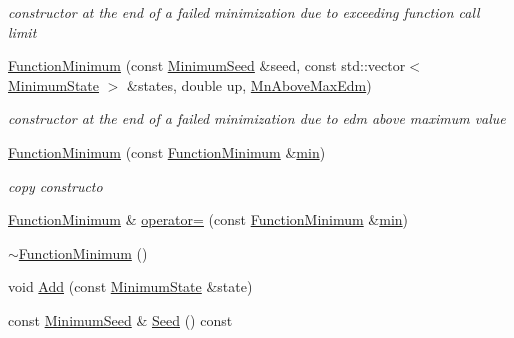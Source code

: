 \begin{DoxyCompactItemize}
\begin{DoxyCompactList}\small\item\em constructor at the end of a failed minimization due to exceeding function call limit \end{DoxyCompactList}\item 
\mbox{\hyperlink{classROOT_1_1Minuit2_1_1FunctionMinimum_a70961c8a405bd4298247c9b353804154}{Function\+Minimum}} (const \mbox{\hyperlink{classROOT_1_1Minuit2_1_1MinimumSeed}{Minimum\+Seed}} \&seed, const std\+::vector$<$ \mbox{\hyperlink{classROOT_1_1Minuit2_1_1MinimumState}{Minimum\+State}} $>$ \&states, double up, \mbox{\hyperlink{classROOT_1_1Minuit2_1_1FunctionMinimum_1_1MnAboveMaxEdm}{Mn\+Above\+Max\+Edm}})
\begin{DoxyCompactList}\small\item\em constructor at the end of a failed minimization due to edm above maximum value \end{DoxyCompactList}\item 
\mbox{\hyperlink{classROOT_1_1Minuit2_1_1FunctionMinimum_a79c734eb76f50e7638255095bd0670aa}{Function\+Minimum}} (const \mbox{\hyperlink{classROOT_1_1Minuit2_1_1FunctionMinimum}{Function\+Minimum}} \&\mbox{\hyperlink{adat__devel_2lib_2SU3_2SU3__internal_8h_ab0f5fed3171eb00d1c5f037d9f518a23}{min}})
\begin{DoxyCompactList}\small\item\em copy constructo \end{DoxyCompactList}\item 
\mbox{\hyperlink{classROOT_1_1Minuit2_1_1FunctionMinimum}{Function\+Minimum}} \& \mbox{\hyperlink{classROOT_1_1Minuit2_1_1FunctionMinimum_a107909f1a994436795eb310f951f14cb}{operator=}} (const \mbox{\hyperlink{classROOT_1_1Minuit2_1_1FunctionMinimum}{Function\+Minimum}} \&\mbox{\hyperlink{adat__devel_2lib_2SU3_2SU3__internal_8h_ab0f5fed3171eb00d1c5f037d9f518a23}{min}})
\item 
\mbox{\hyperlink{classROOT_1_1Minuit2_1_1FunctionMinimum_aaaef452fc02a74a63a9390329ed1dd04}{$\sim$\+Function\+Minimum}} ()
\item 
void \mbox{\hyperlink{classROOT_1_1Minuit2_1_1FunctionMinimum_a13b69e2d431d568f4485eb8b79d6c781}{Add}} (const \mbox{\hyperlink{classROOT_1_1Minuit2_1_1MinimumState}{Minimum\+State}} \&state)
\item 
const \mbox{\hyperlink{classROOT_1_1Minuit2_1_1MinimumSeed}{Minimum\+Seed}} \& \mbox{\hyperlink{classROOT_1_1Minuit2_1_1FunctionMinimum_a9812689b192b202a73ce1178e8098705}{Seed}} () const
\item 

\end{DoxyCompactItemize}
